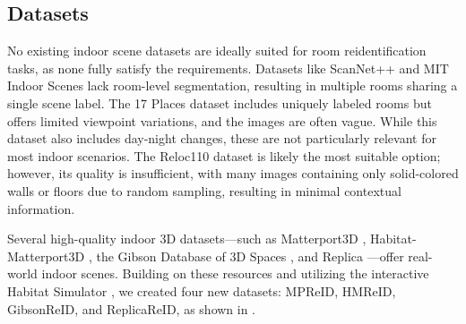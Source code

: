 \subsection{Datasets}
\vspace{-5pt}
No existing indoor scene datasets are ideally suited for room reidentification tasks, as none fully satisfy the requirements.  Datasets like ScanNet++ \cite{yeshwanth2023scannethighfidelitydataset3d} and MIT Indoor Scenes \cite{5206537} lack room-level segmentation, resulting in multiple rooms sharing a single scene label. The 17 Places \cite{7801503} dataset includes uniquely labeled rooms but offers limited viewpoint variations, and the images are often vague. While this dataset also includes day-night changes, these are not particularly relevant for most indoor scenarios. The Reloc110 \cite{aryan2023airlocobjectbasedindoorrelocalization} dataset is likely the most suitable option; however, its quality is insufficient, with many images containing only solid-colored walls or floors due to random sampling, resulting in minimal contextual information.

Several high-quality indoor 3D datasets—such as Matterport3D \cite{Matterport3D}, Habitat-Matterport3D \cite{ramakrishnan2021hm3d}, the Gibson Database of 3D Spaces \cite{xiazamirhe2018gibsonenv}, and Replica \cite{replica19arxiv}—offer real-world indoor scenes. Building on these resources and utilizing the interactive Habitat Simulator \cite{puig2023habitat3, szot2021habitat, habitat19iccv}, we created four new datasets: MPReID, HMReID, GibsonReID, and ReplicaReID, as shown in .



